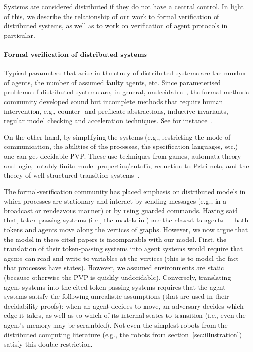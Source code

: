 \iffalse
Systems are considered distributed if they do not have a central control. In light of this, we describe the relationship of our work to formal verification of distributed systems, as well as to work on verification of agent protocols in particular. 

\paragraph{Formal verification of distributed systems}

Typical parameters that arise in the study of distributed systems are the number of agents, the number of assumed faulty agents, etc. Since parameterised problems of distributed systems are, in general, undecidable~\cite{AK86,Suzuki}, the formal methods community developed sound but incomplete methods that require human intervention, e.g., counter- and predicate-abstractions, inductive invariants, regular model checking and acceleration techniques. See for instance~\cite[references on pages 2-3]{PXZ02}.

On the other hand, by simplifying the systems  (e.g., restricting the mode of communication, the abilities of the processes, the specification languages, etc.) one can get decidable PVP. These use techniques from games, automata theory and logic, notably finite-model properties/cutoffs, reduction to Petri nets, and the theory of well-structured transition systems~\cite{GS92,EN95,EsparzaFM99,EmersonK03LICS,CTTV04,KoLo13AAMAS,Delz14,AJKR14,DBLP:conf/icalp/AminofRZS15,AKRSV17}.


The formal-verification community has placed emphasis on distributed models in which processes are stationary and interact by sending messages (e.g., in a broadcast or rendezvous manner) or by using guarded commands. Having said that, token-passing systems (i.e., the models in \cite{EN95,CTTV04,AJKR14,AKRSV17}) are the closest to agents --- both tokens and agents move along the vertices of graphs. However, we now argue that the model in these cited papers is incomparable with our model. First, the translation of their token-passing systems into agent systems would require that agents can read and write to variables at the vertices (this is to model the fact that processes have states). However, we assumed environments are static (because otherwise the PVP is quickly undecidable). Conversely, translating agent-systems into the cited token-passing systems requires that the agent-systems satisfy the following unrealistic assumptions (that are used in their decidability proofs): when an agent decides to move, an adversary decides which edge it takes, as well as to which of its internal states to transition (i.e., even the agent's memory may be scrambled). Not even the simplest robots from the distributed computing literature 
(e.g., the robots from section~\ref{sec:illustration})  satisfy this double restriction.

